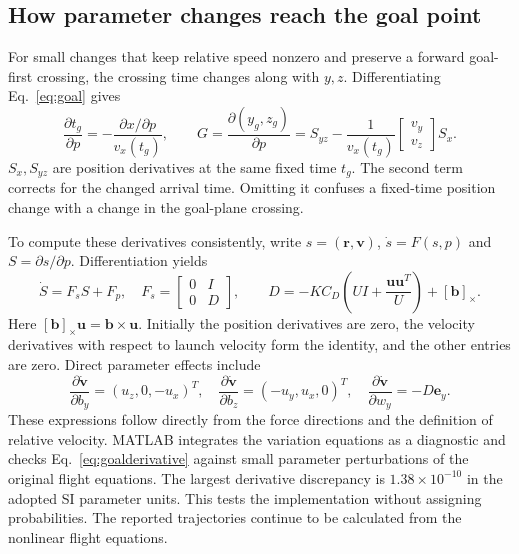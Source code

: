 \documentclass[11pt,a4paper]{article}
\begin{document}
\subsection{How parameter changes reach the goal point}
For small changes that keep relative speed nonzero and preserve a forward goal-first crossing, the crossing time changes along with $y,z$. Differentiating Eq.~\eqref{eq:goal} gives
\begin{equation}
\frac{\partial t_g}{\partial p}=-\frac{\partial x/\partial p}{v_x(t_g)},\qquad
G=\frac{\partial(y_g,z_g)}{\partial p}
=S_{yz}-\frac{1}{v_x(t_g)}\begin{bmatrix}v_y\\v_z\end{bmatrix}S_x.
\label{eq:goalderivative}
\end{equation}
$S_x,S_{yz}$ are position derivatives at the same fixed time $t_g$. The second term corrects for the changed arrival time. Omitting it confuses a fixed-time position change with a change in the goal-plane crossing.

To compute these derivatives consistently, write $s=(\mathbf r,\mathbf v)$, $\dot s=F(s,p)$ and $S=\partial s/\partial p$. Differentiation yields
\begin{equation}
\dot S=F_sS+F_p,\quad
F_s=\begin{bmatrix}0&I\\0&D\end{bmatrix},\qquad
D=-KC_D\left(UI+\frac{\mathbf u\mathbf u^T}{U}\right)+[\mathbf b]_\times.
\end{equation}
Here $[\mathbf b]_\times\mathbf u=\mathbf b\times\mathbf u$. Initially the position derivatives are zero, the velocity derivatives with respect to launch velocity form the identity, and the other entries are zero. Direct parameter effects include
\begin{equation}
\frac{\partial\dot{\mathbf v}}{\partial b_y}=(u_z,0,-u_x)^T,\quad
\frac{\partial\dot{\mathbf v}}{\partial b_z}=(-u_y,u_x,0)^T,\quad
\frac{\partial\dot{\mathbf v}}{\partial w_y}=-D\mathbf e_y.
\end{equation}
These expressions follow directly from the force directions and the definition of relative velocity. MATLAB integrates the variation equations as a diagnostic and checks Eq.~\eqref{eq:goalderivative} against small parameter perturbations of the original flight equations. The largest derivative discrepancy is $1.38\times 10^{-10}$ in the adopted SI parameter units. This tests the implementation without assigning probabilities. The reported trajectories continue to be calculated from the nonlinear flight equations.
\end{document}
